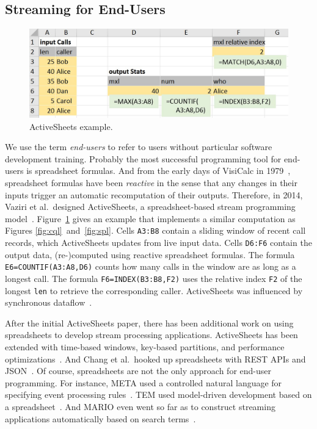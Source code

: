 \subsection{Streaming for End-Users}\label{sec:eup} %

\begin{figure}[!h]
\centerline{\includegraphics[width=\columnwidth]{CallStats.jpg}}
\vspace*{-4mm}
\caption{\label{fig:activesheets}ActiveSheets example.}
\end{figure}

We use the term \emph{end-users} to refer to users without particular
software development training. Probably the most successful
programming tool for end-users is spreadsheet formulas. And from the
early days of VisiCalc in 1979~\cite{bricklin_frankston_1979},
spreadsheet formulas have been \emph{reactive} in the sense that any
changes in their inputs trigger an automatic recomputation of their
outputs. Therefore, in 2014, Vaziri et al.\ designed ActiveSheets, a
spreadsheet-based stream programming model~\cite{vaziri_et_al_2014}.
Figure~\ref{fig:activesheets} gives an example that implements a
similar computation as Figures \mbox{\ref{fig:cql} and \ref{fig:spl}}.
Cells \lstinline{A3:B8} contain a sliding window of recent call
records, which ActiveSheets updates from live input data. Cells
\lstinline{D6:F6} contain the output data, \mbox{(re-)}com\-pu\-ted
using reactive spreadsheet formulas. The formula
\mbox{\lstinline{E6=COUNTIF(A3:A8,D6)}} counts how many calls in the
window are as long as a longest call. The formula
\mbox{\lstinline{F6=INDEX(B3:B8,F2)}} uses the relative index \lstinline{F2}
of the longest \lstinline{len} to retrieve the corresponding
caller.  ActiveSheets was influenced by
synchronous data\-flow~\cite{lustre_1987}.

After the initial ActiveSheets paper, there has been additional work
on using spreadsheets to develop stream processing applications.
ActiveSheets has been extended with time-based windows, key-based
partitions, and performance optimizations~\cite{hirzel_et_al_2016}.
And Chang et al.\ hooked up spreadsheets with REST APIs and
JSON~\cite{chang_myers_2015}.  Of course, spreadsheets are not the
only approach for end-user programming. For instance, META used a
controlled natural language for specifying event processing
rules~\cite{arnold_et_al_2016}. TEM used model-driven development
based on a spreadsheet~\cite{etzion_et_al_2016}. And MARIO even went
so far as to construct streaming applications automatically based on
search terms~\cite{riabov_et_al_2008}.
